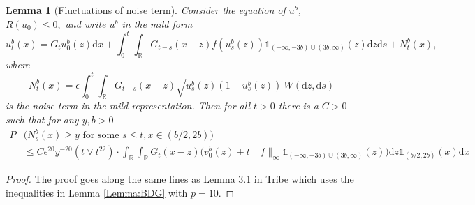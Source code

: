 \documentclass[12pt,a4paper]{amsart}
\numberwithin{equation}{section}
\theoremstyle{plain}
\newtheorem{lemma}[theorem]{Lemma}
\theoremstyle{remark}
\newcommand{\md}{\mathrm{d}}
\newcommand{\e}{\epsilon}
\newcommand{\R}{\mathbb{R}}
\begin{document}
\begin{lemma}[Fluctuations of noise term]\label{lemma:Noise_Fluct}
Consider the equation of $u^b$, $R(u_0) \leq 0,$ and write $u^b$ in the mild form
\[
u_t^b(x) = G_tu_0^b(z)\md x + \int_0^t\int_\R G_{t - s}(x-z)f(u_s^b(z))\mathds{1}_{(-\infty, -3b) \cup (3b, \infty)}(z)\md z \md s + N_t^b(x),
\]
where 
\[
N_t^b(x) = \e\int_0^t\int_\R G_{t - s}(x - z)\sqrt{u_s^b(z)(1 - u_s^b(z))}\, W(\md z, \md s)
\]
is the noise term in the mild representation. Then for all $t > 0$ there is a $C > 0$ such that for any $y, b > 0$
\begin{align*}
P&\Big(N_s^b(x) \geq y \text{ for some } s \leq t, x \in (b/2, 2b)\Big)\\
&\leq C \e^{20}y^{-20}(t \lor t^{22})\cdot \int_\R\int_\R G_t(x - z)\Big(v_0^b(z) + t\|f\|_{\infty}\mathds{1}_{(-\infty, -3b) \cup (3b, \infty)}(z)\Big)\md z \mathds{1}_{(b/2, 2b)}(x)\md x
\end{align*}
\end{lemma}
\begin{proof}
The proof goes along the same lines as Lemma 3.1 in Tribe \cite{Tribe} which uses the inequalities in Lemma \ref{Lemma:BDG} with $p = 10.$
\end{proof}
\end{document}
